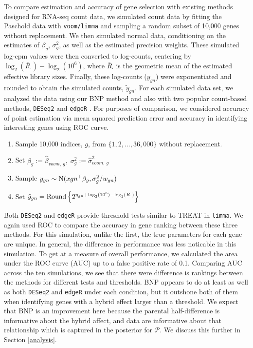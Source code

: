 To compare estimation and accuracy of gene selection with existing methods designed for RNA-seq count data, we simulated count data by fitting the Paschold data with \texttt{voom/limma} and sampling a random subset of 10,000 genes without replacement. We then simulated normal data, conditioning on the estimates of $\beta_g$, $\sigma^2_g$, as well as the estimated precision weights. These simulated log-cpm values were then converted to log-counts, centering by $\log_2(\bar{R}_\cdot)-\log_2(10^6)$, where $\bar{R}_\cdot$ is the geometric mean of the estimated effective library sizes. Finally, these log-counts ($y_{gn}$) were exponentiated and rounded to obtain the simulated counts, $\tilde{y}_{gn}$. For each simulated data set, we analyzed the data using our BNP method and also with two popular count-based methods, \texttt{DESeq2} and \texttt{edgeR} \citep{edger2010,deseq2014}. For purposes of comparison, we considered accuracy of point estimation via mean squared prediction error and accuracy in identifying interesting genes using ROC curve.
\begin{enumerate}
\item Sample 10,000 indices, $g$, from $\{1,2,\ldots,36,000\}$ without replacement.
\item Set $\beta_g:= \hat{\beta}_{voom,~g},\; \sigma^2_g:= \hat{\sigma}^2_{voom,~g}$
\item Sample $y_{gn} \sim \operatorname{N}(x{gn}^\top\beta_g, \sigma^2_g/w_{gn})$
\item Set $\tilde{y}_{gn} = \operatorname{Round} \left\{ 2^{y_{gn} + \log_2(10^6) - \log_2(\bar{R}_{\cdot})} \right\}$
\end{enumerate}


Both \texttt{DESeq2} and \texttt{edgeR} provide threshold tests similar to TREAT in \texttt{limma}. We again used ROC to compare the accuracy in gene ranking between these three methods. For this simulation, unlike the first, the true parameters for each gene are unique. In general, the difference in performance was less noticable in this simulation. To get at a measure of overall performance, we calculated the area under the ROC curve (AUC) up to a false positive rate of 0.1. Comparing AUC across the ten simulations, we see that there were difference is rankings between the methods for different tests and thresholds. BNP appears to do at least as well as both \texttt{DESeq2} and \texttt{edgeR} under each condition, but it outshone both of them when identifying genes with a hybrid effect larger than a threshold. We expect that BNP is an improvement here because the parental half-difference is informative about the hybrid affect, and data are informative about that relationship which is captured in the posterior for $\mathcal{P}$. We discuss this further in Section \ref{analysis}. 

